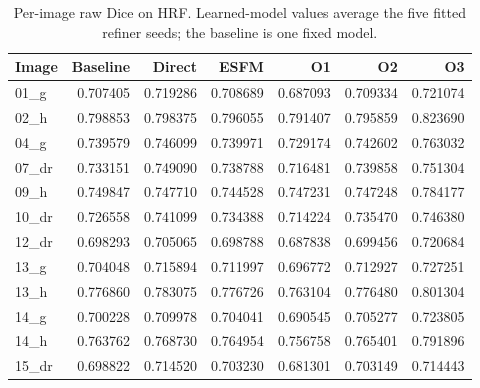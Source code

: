 \begin{table}[p]
\caption{Per-image raw Dice on HRF. Learned-model values average the five fitted refiner seeds; the baseline is one fixed model.}\label{tab:completion-hrf-image-means}
\centering\small\setlength{\tabcolsep}{4pt}
\begin{tabular}{lrrrrrr}
\toprule
Image & Baseline & Direct & ESFM & O1 & O2 & O3 \\
\midrule
01\_g & 0.707405 & 0.719286 & 0.708689 & 0.687093 & 0.709334 & 0.721074 \\
02\_h & 0.798853 & 0.798375 & 0.796055 & 0.791407 & 0.795859 & 0.823690 \\
04\_g & 0.739579 & 0.746099 & 0.739971 & 0.729174 & 0.742602 & 0.763032 \\
07\_dr & 0.733151 & 0.749090 & 0.738788 & 0.716481 & 0.739858 & 0.751304 \\
09\_h & 0.749847 & 0.747710 & 0.744528 & 0.747231 & 0.747248 & 0.784177 \\
10\_dr & 0.726558 & 0.741099 & 0.734388 & 0.714224 & 0.735470 & 0.746380 \\
12\_dr & 0.698293 & 0.705065 & 0.698788 & 0.687838 & 0.699456 & 0.720684 \\
13\_g & 0.704048 & 0.715894 & 0.711997 & 0.696772 & 0.712927 & 0.727251 \\
13\_h & 0.776860 & 0.783075 & 0.776726 & 0.763104 & 0.776480 & 0.801304 \\
14\_g & 0.700228 & 0.709978 & 0.704041 & 0.690545 & 0.705277 & 0.723805 \\
14\_h & 0.763762 & 0.768730 & 0.764954 & 0.756758 & 0.765401 & 0.791896 \\
15\_dr & 0.698822 & 0.714520 & 0.703230 & 0.681301 & 0.703149 & 0.714443 \\
\bottomrule
\end{tabular}
\end{table}

